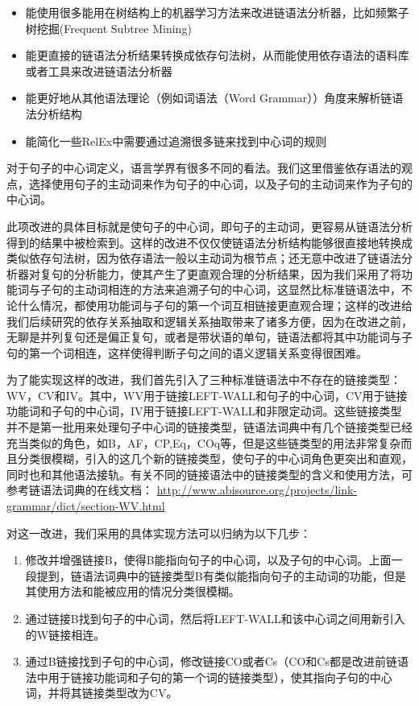 \begin{itemize}
\item 能使用很多能用在树结构上的机器学习方法来改进链语法分析器，比如频繁子树挖掘(Frequent Subtree Mining)\cite{Chi2005}
\item 能更直接的链语法分析结果转换成依存句法树，从而能使用依存语法的语料库或者工具来改进链语法分析器
\item 能更好地从其他语法理论（例如词语法（Word Grammar）\cite{Hudson2007}）角度来解析链语法分析结构
\item 能简化一些RelEx中需要通过追溯很多链来找到中心词的规则
\end{itemize}

对于句子的中心词定义，语言学界有很多不同的看法。我们这里借鉴依存语法的观点，选择使用句子的主动词来作为句子的中心词，以及子句的主动词来作为子句的中心词。

此项改进的具体目标就是使句子的中心词，即句子的主动词，更容易从链语法分析得到的结果中被检索到。这样的改进不仅仅使链语法分析结构能够很直接地转换成类似依存句法树，因为依存语法一般以主动词为根节点；还无意中改进了链语法分析器对复句的分析能力，使其产生了更直观合理的分析结果，因为我们采用了将功能词与子句的主动词相连的方法来追溯子句的中心词，这显然比标准链语法中，不论什么情况，都使用功能词与子句的第一个词互相链接更直观合理；这样的改进给我们后续研究的依存关系抽取和逻辑关系抽取带来了诸多方便，因为在改进之前，无聊是并列复句还是偏正复句，或者是带状语的单句，链语法都将其中功能词与子句的第一个词相连，这样使得判断子句之间的语义逻辑关系变得很困难。

为了能实现这样的改进，我们首先引入了三种标准链语法中不存在的链接类型：WV，CV和IV。其中，WV用于链接LEFT-WALL和句子的中心词，CV用于链接功能词和子句的中心词，IV用于链接LEFT-WALL和非限定动词。这些链接类型并不是第一批用来处理句子中心词的链接类型，链语法词典中有几个链接类型已经充当类似的角色，如B，AF，CP,Eq，COq等，但是这些链类型的用法非常复杂而且分类很模糊，引入的这几个新的链接类型，使句子的中心词角色更突出和直观，同时也和其他语法接轨。有关不同的链接语法中的链接类型的含义和使用方法，可参考链语法词典的在线文档： \url{http://www.abisource.org/projects/link-grammar/dict/section-WV.html}

对这一改进，我们采用的具体实现方法可以归纳为以下几步：
\begin{enumerate}
\item 修改并增强链接B，使得B能指向句子的中心词，以及子句的中心词。上面一段提到，链语法词典中的链接类型B有类似能指向句子的主动词的功能，但是其使用方法和能被应用的情况分类很模糊。
\item 通过链接B找到句子的中心词，然后将LEFT-WALL和该中心词之间用新引入的W链接相连。
\item 通过B链接找到子句的中心词，修改链接CO或者Cs（CO和Cs都是改进前链语法中用于链接功能词和子句的第一个词的链接类型），使其指向子句的中心词，并将其链接类型改为CV。
\end{enumerate}

